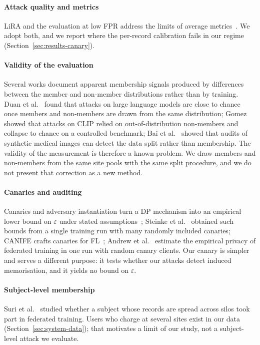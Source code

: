 \paragraph{Attack quality and metrics} LiRA and the evaluation at low FPR
address the limits of average metrics~\cite{carlini2022membership}. We adopt
both, and we report where the per-record calibration fails in our regime
(Section~\ref{sec:results-canary}).

\paragraph{Validity of the evaluation} Several works document apparent
membership signals produced by differences between the member and non-member
distributions rather than by training. Duan et al.~\cite{duan2024mia} found
that attacks on large language models are close to chance once members and
non-members are drawn from the same distribution; Gomez~\cite{gomez2026clip}
showed that attacks on CLIP relied on out-of-distribution non-members and
collapse to chance on a controlled benchmark; Bai et al.~\cite{bai2026splitbias}
showed that audits of synthetic medical images can detect the data split
rather than membership. The validity of the measurement is therefore a known
problem. We draw members and non-members from the same site pools with the
same split procedure, and we do not present that correction as a new method.

\paragraph{Canaries and auditing} Canaries and adversary instantiation turn a
DP mechanism into an empirical lower bound on $\varepsilon$ under stated
assumptions~\cite{jagielski2020auditing,nasr2021adversary,nasr2023tight};
Steinke et al.~\cite{steinke2023privacy} obtained such bounds from a single
training run with many randomly included canaries; CANIFE crafts canaries for
FL~\cite{maddock2023canife}; Andrew et al.~\cite{andrew2024oneshot} estimate
the empirical privacy of federated training in one run with random canary
clients. Our canary is simpler and serves a different purpose: it tests
whether our attacks detect induced memorisation, and it yields no bound on
$\varepsilon$.

\paragraph{Subject-level membership} Suri et al.~\cite{suri2022subject}
studied whether a subject whose records are spread across silos took part in
federated training. Users who charge at several sites exist in our data
(Section~\ref{sec:system-data}); that motivates a limit of our study, not a
subject-level attack we evaluate.

